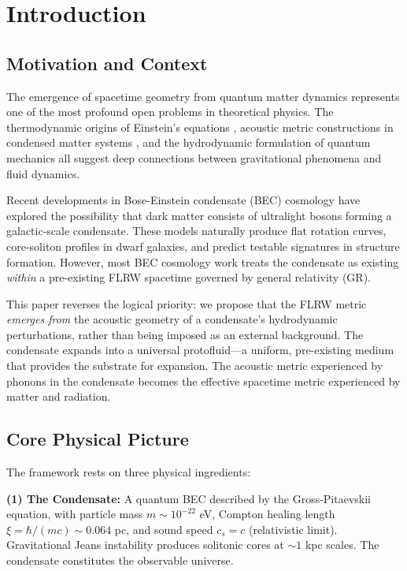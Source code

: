\documentclass[11pt,a4paper]{article}
\theoremstyle{definition}
\theoremstyle{remark}
\begin{document}
\section{Introduction}
\label{sec:introduction}

\subsection{Motivation and Context}
\label{sec:motivation}

The emergence of spacetime geometry from quantum matter dynamics represents one of the most profound open problems in theoretical physics. The thermodynamic origins of Einstein's equations \cite{Jacobson1995,Padmanabhan2010}, acoustic metric constructions in condensed matter systems \cite{Unruh1981,Barcelo2005}, and the hydrodynamic formulation of quantum mechanics \cite{Madelung1927} all suggest deep connections between gravitational phenomena and fluid dynamics.

Recent developments in Bose-Einstein condensate (BEC) cosmology \cite{Berezhiani2015,Suarez2014,Sharma2020} have explored the possibility that dark matter consists of ultralight bosons forming a galactic-scale condensate. These models naturally produce flat rotation curves, core-soliton profiles in dwarf galaxies, and predict testable signatures in structure formation. However, most BEC cosmology work treats the condensate as existing \emph{within} a pre-existing FLRW spacetime governed by general relativity (GR).

This paper reverses the logical priority: we propose that the FLRW metric \emph{emerges from} the acoustic geometry of a condensate's hydrodynamic perturbations, rather than being imposed as an external background. The condensate expands into a universal protofluid---a uniform, pre-existing medium that provides the substrate for expansion. The acoustic metric experienced by phonons in the condensate becomes the effective spacetime metric experienced by matter and radiation.

\subsection{Core Physical Picture}
\label{sec:physical_picture}

The framework rests on three physical ingredients:

\textbf{(1) The Condensate:} A quantum BEC described by the Gross-Pitaevskii equation, with particle mass $m \sim 10^{-22}$ eV, Compton healing length $\xi = \hbar/(mc) \sim 0.064$ pc, and sound speed $c_s = c$ (relativistic limit). Gravitational Jeans instability produces solitonic cores at $\sim 1$ kpc scales. The condensate constitutes the observable universe.
\end{document}
